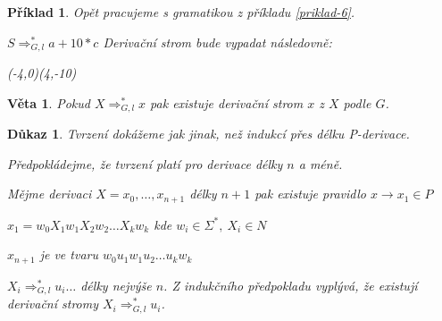 \documentclass[10pt, a4paper, titlepage]{article}
\theoremstyle{note}
\newtheorem{veta}{Věta}
\newtheorem{dukaz}{Důkaz}
\newtheorem{priklad}{Příklad}
\begin{document}
\begin{priklad}
Opět pracujeme s gramatikou z příkladu \ref{priklad-6}.

$S \Rightarrow_{G,l}^* a+10*c$ \quad Derivační strom bude vypadat následovně:

\begin{center}
\begin{VCPicture}{(-4,0)(4,-10)}
\MediumState
{}

\end{VCPicture}
\end{center}
\end{priklad}

\begin{veta}
Pokud $X \Rightarrow_{G,l}^* x$ pak existuje derivační strom $x$ z $X$ podle $G$.
\end{veta}
\begin{dukaz}
Tvrzení dokážeme jak jinak, než indukcí přes délku P-derivace.

Předpokládejme, že tvrzení platí pro derivace délky $n$ a méně.

Mějme derivaci $X=x_0,\ldots,x_{n+1}$ délky $n+1$ pak existuje pravidlo $x \rightarrow x_1 \in P$

$x_1=w_0X_1w_1X_2w_2 \ldots X_kw_k$ kde $w_i \in \Sigma^*,\ X_i\in N$

$x_{n+1}$ je ve tvaru $w_0u_1w_1u_2\ldots u_kw_k$

$X_i \Rightarrow_{G,l}^* u_i \ldots$ délky nejvýše $n$. Z indukčního předpokladu vyplývá, že existují derivační stromy $X_i \Rightarrow_{G,l}^* u_i$.
\end{dukaz}
\end{document}
